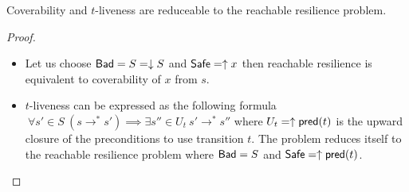 
\iffalse

\textcolor{blue}{
et encore: renforcer sur l'hypothèses sur I, J tous les deux clos par le haut+bas.
}

\textcolor{blue}{
compute the sets of $(I,J,k)$ st S is resilient.\\
max des I,J possibles \\
}


\fi



\begin{proposition}\label{reductions}
Coverability and $t$-liveness are reduceable to the reachable resilience problem.
\end{proposition}


\begin{proof}

\begin{itemize}
\item Let us choose $\textsf{Bad}=S= \downarrow S$ and $\textsf{Safe}=\uparrow x$ then reachable resilience is equivalent to coverability of $x$ from $s$.

\item $t$-liveness  can be expressed as the following formula
$ ~ \forall s' \in S ~ (s \rightarrow^* s') \implies \exists s'' \in U_t ~ s' \rightarrow^{*} s''$ 
where
$U_t=\uparrow \textsf{pred}(t)$
is the upward closure of the preconditions to use transition $t$.  
The problem reduces itself to the reachable resilience problem
where $\textsf{Bad}=S$ and $\textsf{Safe} = \uparrow \textsf{pred}(t)$.

\end{itemize}

\end{proof}









